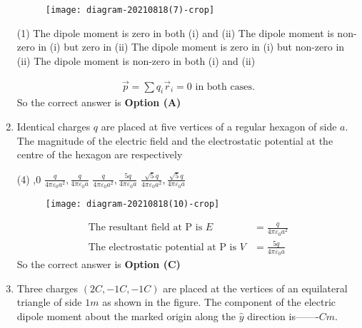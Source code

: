 \begin{enumerate}
\begin{figure}[H]
\centering
\texttt{[image: diagram-20210818(7)-crop]}
\end{figure}
\begin{tasks}(1)
\task[\textbf{A.}] The dipole moment is zero in both (i) and (ii)
\task[\textbf{B.}] The dipole moment is non-zero in (i) but zero in (ii)
\task[\textbf{C.}] The dipole moment is zero in (i) but non-zero in (ii)
\task[\textbf{D.}] The dipole moment is non-zero in both (i) and (ii)
\end{tasks}
\begin{answer}
\begin{align*}
\vec{p}=\sum q_{i} \vec{r}_{i}=0\text{ in both cases.}
\end{align*}
So the correct answer is \textbf{Option (A)}
\end{answer}
\item Identical charges $q$ are placed at five vertices of a regular hexagon of side $a$. The magnitude of the electric field and the electrostatic potential at the centre of the hexagon are respectively
{}

\begin{tasks}(4)
,0
\task[\textbf{B.}] $\frac{q}{4 \pi \varepsilon_{0} a^{2}}, \frac{q}{4 \pi \varepsilon_{0} a}$
\task[\textbf{C.}] $\frac{q}{4 \pi \varepsilon_{0} a^{2}}, \frac{5 q}{4 \pi \varepsilon_{0} a}$
\task[\textbf{D.}]  $\frac{\sqrt{5} q}{4 \pi \varepsilon_{0} a^{2}}, \frac{\sqrt{5} q}{4 \pi \varepsilon_{0} a}$
\end{tasks}
\begin{answer}
\begin{figure}[H]
	\centering
	\texttt{[image: diagram-20210818(10)-crop]}
\end{figure}
\begin{align*}
\text{The resultant field at }\mathrm{P}\text{ is }E&=\frac{q}{4 \pi \varepsilon_{0} a^{2}}\\
\text{The electrostatic potential at }\mathrm{P}\text{ is }V&=\frac{5 q}{4 \pi \varepsilon_{0} a}
\end{align*}
So the correct answer is \textbf{Option (C)}
\end{answer}
\item Three charges $(2 C,-1 C,-1 C)$ are placed at the vertices of an equilateral triangle of side $1 m$ as shown in the figure. The component of the electric dipole moment about the marked origin along the $\hat{y}$ direction is-------$C m$.
{}


\end{enumerate}
